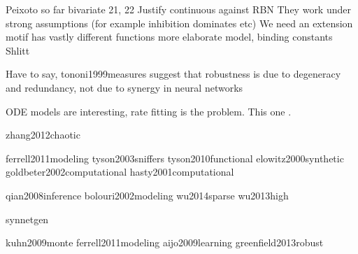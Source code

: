 \documentclass[../main.tex]{subfiles}
\begin{document}
\cite{zhang2012chaotic}


Peixoto so far
bivariate 21, 22
Justify continuous against RBN
They work under strong assumptions (for example inhibition dominates etc) \cite{}
We need an extension
motif has vastly different functions \cite{ingram2006network}
more elaborate model, binding constants	\cite{ingram2006network}
Shlitt

Have to say, tononi1999measures suggest that robustness is due to degeneracy and redundancy, not due to synergy in neural networks



ODE models are interesting, rate fitting is the problem. This one \cite{kuhn2009monte}.


zhang2012chaotic

ferrell2011modeling
tyson2003sniffers
tyson2010functional
elowitz2000synthetic
goldbeter2002computational
hasty2001computational

qian2008inference
bolouri2002modeling
wu2014sparse
wu2013high

synnetgen

kuhn2009monte
ferrell2011modeling
aijo2009learning
greenfield2013robust
\end{document}

